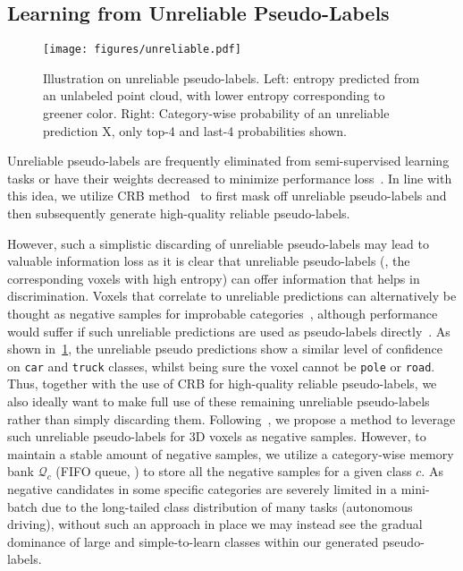 \documentclass[10pt,twocolumn,letterpaper]{article}
\begin{document}
\subsection{Learning from Unreliable Pseudo-Labels}
\label{sec:learning-from-unreliable-pseudo-labels}


\begin{figure}[thp]
    \centering
    \texttt{[image: figures/unreliable.pdf]}
    \caption{Illustration on unreliable pseudo-labels. Left: entropy predicted from an unlabeled point cloud, with lower entropy corresponding to greener color. Right: Category-wise probability of an unreliable prediction \colorbox[RGB]{115,0,231}{\textcolor{fg3_yellow}{\textsf{X}}}, only \textcolor{fg3_blue}{top-4} and \textcolor{fg3_orange}{last-4} probabilities shown.}
    \label{fig:unreliable}
    \vspace{-8pt}
\end{figure}

\noindent
Unreliable pseudo-labels are frequently eliminated from semi-supervised learning tasks or have their weights decreased to minimize performance loss~\cite{sajjadi2016regularization,xie2020selftraining,zou2021pseudoseg,jiang2021guided,yang2022stb,Unal_2022_CVPR}. In line with this idea, we utilize CRB method~\cite{Unal_2022_CVPR} to first mask off unreliable pseudo-labels and then subsequently generate high-quality reliable pseudo-labels. 

However, such a simplistic discarding of unreliable pseudo-labels may lead to valuable information loss as it is clear that unreliable pseudo-labels (\ie, the corresponding voxels with high entropy) can offer information that helps in discrimination. Voxels that correlate to unreliable predictions can alternatively be thought as negative samples for improbable categories~\cite{wang2022semisupervised}, although performance would suffer if such unreliable predictions are used as pseudo-labels directly~\cite{arazo2020pseudolabeling}. 
As shown in~\cref{fig:unreliable}, the unreliable pseudo predictions show a similar level of confidence on \texttt{car} and \texttt{truck} classes, whilst being sure the voxel cannot be \texttt{pole} or \texttt{road}. 
Thus, together with the use of CRB for high-quality reliable pseudo-labels, we also ideally want to make full use of these remaining unreliable pseudo-labels rather than simply discarding them. Following~\cite{wang2022semisupervised}, we propose a method to leverage such unreliable pseudo-labels for 3D voxels as negative samples. However, to maintain a stable amount of negative samples, we utilize a category-wise memory bank $\mathcal{Q}_c$ (FIFO queue, \cite{wu2018unsupervised}) to store all the negative samples for a given class $c$. As negative candidates in some specific categories are severely limited in a mini-batch due to the long-tailed class distribution of many tasks (\eg autonomous driving), without such an approach in place we may instead see the gradual dominance of large and simple-to-learn classes within our generated pseudo-labels. 
\end{document}
